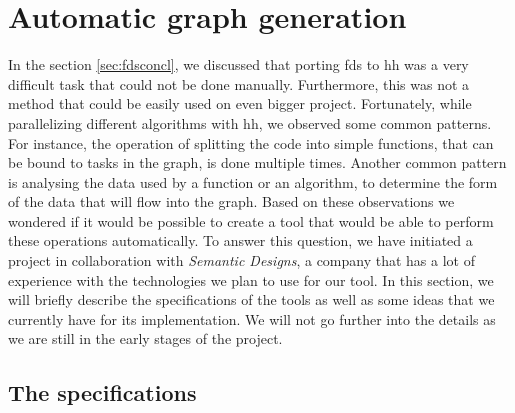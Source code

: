 
\clearpage{}
\section{Automatic graph generation}

In the section \ref{sec:fdsconcl}, we discussed that porting \gls{fds} to
\gls{hh} was a very difficult task that could not be done manually. Furthermore,
this was not a method that could be easily used on even bigger project.
Fortunately, while parallelizing different algorithms with \gls{hh}, we observed
some common patterns. For instance, the operation of splitting the code into
simple functions, that can be bound to tasks in the graph, is done multiple
times. Another common pattern is analysing the data used by a function or an
algorithm, to determine the form of the data that will flow into the graph.
Based on these observations we wondered if it would be possible to create a tool
that would be able to perform these operations automatically. To answer this
question, we have initiated a project in collaboration with \textit{Semantic
Designs}, a company that has a lot of experience with the technologies we plan
to use for our tool. In this section, we will briefly describe the
specifications of the tools as well as some ideas that we currently have for its
implementation. We will not go further into the details as we are still in the
early stages of the project.

\subsection{The specifications}

